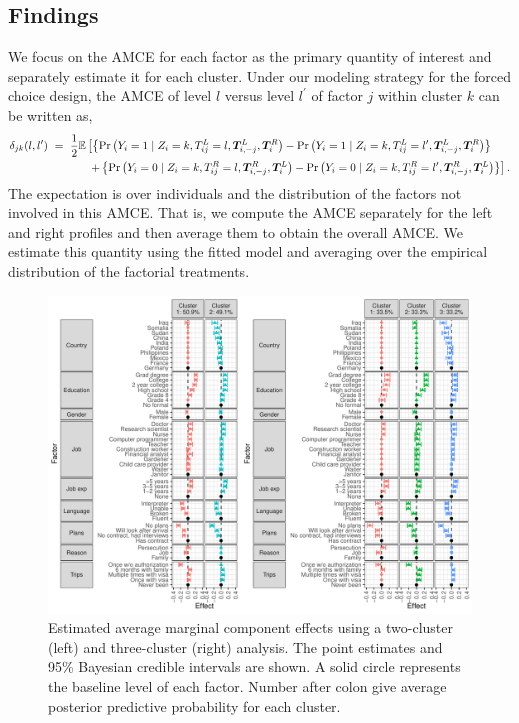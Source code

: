 \subsection{Findings}

We focus on the AMCE for each factor as the primary quantity of
interest and separately estimate it for each cluster.  Under our
modeling strategy for the forced choice design, the AMCE of level $l$
versus level $l^\prime$ of factor $j$ within cluster $k$ can be
written as,
\begin{align*}
\delta_{jk}(l, l^\prime) & \ = \ \frac{1}{2}\mathbb{E} \left[
                         \left\{\Pr\left(Y_i = 1 \mid Z_i=k, T^L_{ij}=l,
                         \bm{T}^L_{i,-j}, \bm{T}^R_{i}\right) -
                         \Pr\left(Y_i = 1 \mid Z_i=k, T^L_{ij}=l^\prime,
                         \bm{T}^L_{i,-j}, \bm{T}^R_{i}\right)
                         \right\}\right. \\
  & \hspace{.5in} \left.
                         +\left\{\Pr\left(Y_i = 0 \mid Z_i=k, T^R_{ij}=l,
                         \bm{T}^R_{i,-j}, \bm{T}^L_{i}\right) -
                         \Pr\left(Y_i = 0 \mid Z_i=k, T^R_{ij}=l^\prime,
                         \bm{T}^R_{i,-j}, \bm{T}^L_{i}\right)
    \right\}\right]. 
\end{align*}
The expectation is over individuals and the distribution of the factors not involved in this AMCE.
That is, we compute the AMCE separately for the left and right
profiles and then average them to obtain the overall AMCE.  We
estimate this quantity using the fitted model and averaging over the
empirical distribution of the factorial treatments. 

\begin{figure}[t!]
\centering {}
\includegraphics[width=\textwidth]{figures/AME_plot.pdf}
\caption{Estimated average marginal component effects using a
  two-cluster (left) and three-cluster (right) analysis. The point
  estimates and 95\% Bayesian credible intervals are shown. A solid
  circle represents the baseline level of each factor.  Number after
  colon give average posterior predictive probability for each
  cluster.} \label{fig:ame}
\end{figure}


